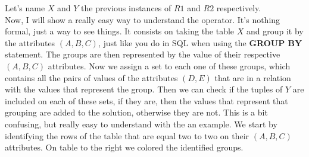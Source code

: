 \documentclass{article}
\begin{document}
\newpage
\parbox{.70\linewidth}{
Let's name $X$ and $Y$ the previous instances of $R1$ and $R2$ respectively. \\

\vskip 0.2in
Now, I will show a really easy way to understand the operator. It's nothing formal, just a way to see things. It consists on taking the table $X$ and group it by the attributes $(A,B,C)$, just like you do in SQL when using the \textbf{GROUP BY} statement. The groups are then represented by the value of their respective $(A,B,C)$ attributes. Now we assign a set to each one of these groups, which contains all the pairs of values of the attributes $(D,E)$ that are in a relation with the values that represent the group. Then we can check if the tuples of $Y$ are included on each of these sets, if they are, then the values that represent that grouping are added to the solution, otherwise they are not. This is a bit confusing, but really easy to understand with the an example.
\vskip 0.2in
We start by identifying the rows of the table that are equal two to two on their $(A,B,C)$ attributes. On table to the right we colored the identified groups.

\vskip 0.2in
}
\end{document}
